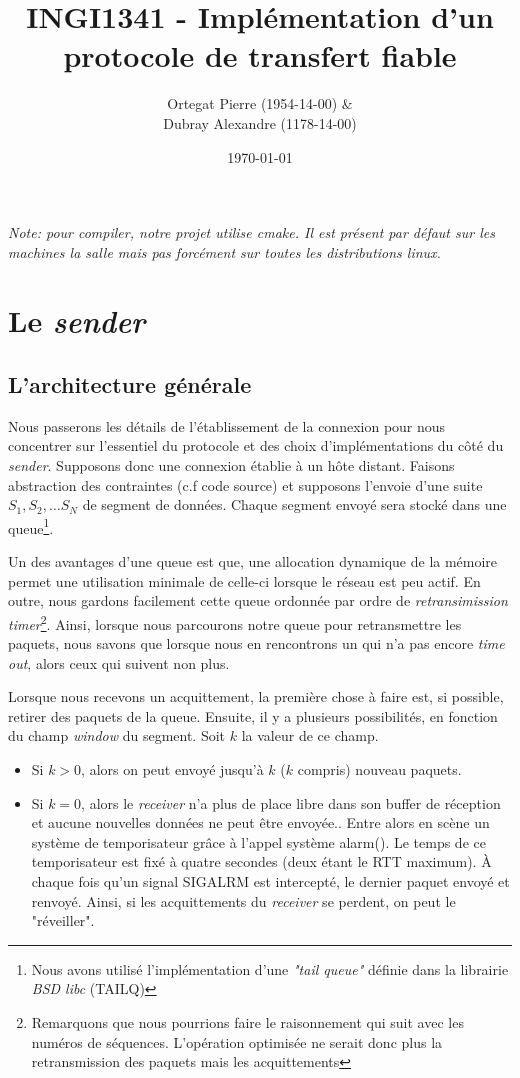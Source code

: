 \documentclass[12pt,notitlepage]{report}
\title{INGI1341 - Implémentation d'un protocole de transfert fiable}
\author{Ortegat Pierre (1954-14-00) \& \\ Dubray Alexandre (1178-14-00)}
\date{\today}
\begin{document}
\maketitle

\emph{Note: pour compiler, notre projet utilise cmake. Il est présent par défaut sur les machines la salle mais pas forcément sur toutes les distributions linux.}
\section{Le \textit{sender}}
	\subsection{L'architecture générale}
	Nous passerons les détails de l'établissement de la connexion pour nous concentrer sur l'essentiel du protocole et des choix d'implémentations du côté du \textit{sender}. Supposons donc une connexion établie à un hôte distant. Faisons abstraction des contraintes (c.f code source) et supposons l'envoie d'une suite $S_1 , S_2, \ldots S_N$ de segment de données. Chaque segment envoyé sera stocké dans une queue\footnote{Nous avons utilisé l'implémentation d'une \textit{"tail queue"} définie dans la librairie \textit{BSD libc} (TAILQ)}. 
	
	Un des avantages d'une queue est que, une allocation dynamique de la mémoire permet une utilisation minimale de celle-ci lorsque le réseau est peu actif.	En outre, nous gardons facilement cette queue ordonnée par ordre de \textit{retransimission timer}\footnote{Remarquons que nous pourrions faire le raisonnement qui suit avec les numéros de séquences. L'opération optimisée ne serait donc plus la retransmission des paquets mais les acquittements}. Ainsi, lorsque nous parcourons notre queue pour retransmettre les paquets, nous savons que lorsque nous en rencontrons un qui n'a pas encore \textit{time out}, alors ceux qui suivent non plus.
	
	Lorsque nous recevons un acquittement, la première chose à faire est, si possible, retirer des paquets de la queue. Ensuite, il y a plusieurs possibilités, en fonction du champ \textit{window} du segment. Soit $k$ la valeur de ce champ.
	\begin{itemize}
		\item Si $k > 0$, alors on peut envoyé jusqu'à $k$ ($k$ compris) nouveau paquets.
		\item Si $k = 0$, alors le \textit{receiver} n'a plus de place libre dans son buffer de réception et aucune nouvelles données ne peut être envoyée.. Entre alors en scène un système de temporisateur grâce à l'appel système alarm(). Le temps de ce temporisateur est fixé à quatre secondes (deux étant le RTT maximum). À chaque fois qu'un signal SIGALRM est intercepté, le dernier paquet envoyé et renvoyé. Ainsi, si les acquittements du \textit{receiver} se perdent, on peut le "réveiller".
	\end{itemize}
\end{document}
